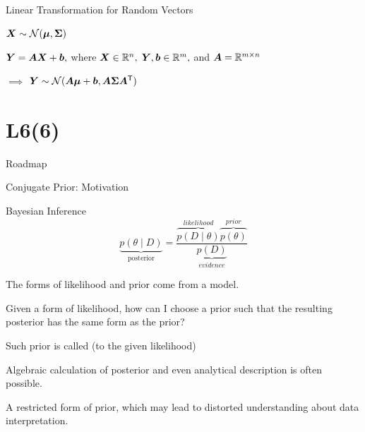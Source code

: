 \documentclass[handout,fleqn,aspectratio=169]{beamer}
\begin{document}
\begin{frame}{Linear Transformation for Random Vectors}

\plitemsep 0.5in
\bci 
\item $\bm{X} \sim \mathcal N(\bm{\mu}, \bm{\Sigma})$
\item $\bm{Y} = \bm{A} \bm{X} + \bm{b},$ where $\bm{X} \in {\mathbb R}^{n},$ $\bm{Y}, \bm{b} \in {\mathbb R}^{m},$ and $\bm{A} = {\mathbb R}^{m \times n}$

\item[$\implies$] $\bm{Y} \sim \mathcal N(\bm{A} \bm{\mu} + \bm{b}, \bm{A} \bm{\Sigma} {\bm{A}}^{\mathsf{T}})$
\eci
\end{frame}

\section{L6(6)}
\begin{frame}{Roadmap}

\plitemsep 0.1in

\bce[(1)] 

\item {}
\item {} 
\item {} 
\item {}
\item {}
\item {} 
\item {}

\ece
\end{frame}

\begin{frame}{Conjugate Prior: Motivation}

\plitemsep 0.1in

\bci 

\item Bayesian Inference
$$
\underbrace{p(\theta \mid D)}_{\text{posterior}}  = \frac{\overbrace{p(D \mid \theta)}^{likelihood} \overbrace{p(\theta)}^{prior}}{\underbrace{p(D)}_{evidence}}
$$
\item The forms of likelihood and prior come from a model. 

\item \question Given a form of likelihood, how can I choose a prior such that the resulting posterior has the same form as the prior?
\bci
\item Such prior is called  (to the given likelihood)
\item {} Algebraic calculation of posterior and even analytical description is often possible. 
\item {} A restricted form of prior, which may lead to distorted understanding about data interpretation.
\eci
\eci
\end{frame}
\end{document}
